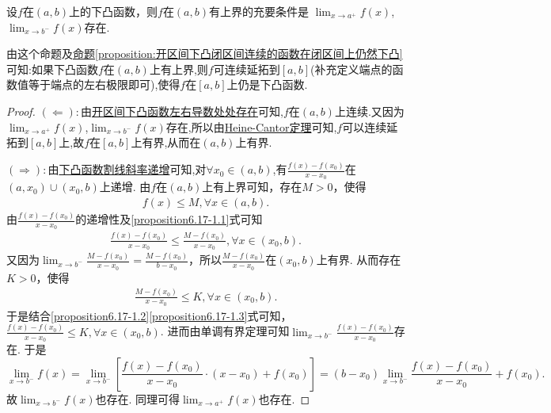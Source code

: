 \documentclass[../../main.tex]{subfiles}%
\begin{document}
\begin{proposition}\label{proposition:开区间的下凸函数有上界的充要条件}
设\(f\)在\((a,b)\)上的下凸函数，则\(f\)在\((a,b)\)有上界的充要条件是
$\lim_{x\rightarrow a^{+}}f(x)$,$\lim_{x\rightarrow b^{-}}f(x)$存在.
\end{proposition}
\begin{note}
由这个命题及\hyperref[proposition:开区间下凸闭区间连续的函数在闭区间上仍然下凸]{命题\ref{proposition:开区间下凸闭区间连续的函数在闭区间上仍然下凸}}可知:如果下凸函数$f$在$(a,b)$上有上界,则$f$可连续延拓到$[a,b]$(补充定义端点的函数值等于端点的左右极限即可),使得$f$在$[a,b]$上仍是下凸函数.
\end{note}
\begin{proof}

$(\Leftarrow):$由\hyperref[theorem:开区间下凸函数左右导数处处存在]{开区间下凸函数左右导数处处存在}可知,$f$在$(a,b)$上连续.又因为$\lim_{x\rightarrow a^{+}}f(x)$,$\lim_{x\rightarrow b^{-}}f(x)$存在,所以由\hyperref[theroem:Heine-Cantor定理]{Heine-Cantor定理}可知,$f$可以连续延拓到$[a,b]$上,故$f$在$[a,b]$上有界,从而在$(a,b)$上有界.

$(\Rightarrow):$由\hyperref[下凸函数割线斜率递增]{下凸函数割线斜率递增}可知,对$\forall x_0\in (a,b)$,有\(\frac{f(x) - f(x_0)}{x - x_0}\)在\((a, x_0)\cup(x_0, b)\)上递增. 由\(f\)在\((a, b)\)上有上界可知，存在\(M > 0\)，使得
\begin{align}
f(x)\leqslant M, \forall x\in(a, b). \label{proposition6.17-1.1}
\end{align}
由\(\frac{f(x) - f(x_0)}{x - x_0}\)的递增性及\eqref{proposition6.17-1.1}式可知
\begin{align}
\frac{f(x) - f(x_0)}{x - x_0}\leqslant\frac{M - f(x_0)}{x - x_0}, \forall x\in(x_0, b). \label{proposition6.17-1.2}
\end{align}
又因为\(\lim_{x\rightarrow b^-}\frac{M - f(x_0)}{x - x_0}=\frac{M - f(x_0)}{b - x_0}\)，所以\(\frac{M - f(x_0)}{x - x_0}\)在\((x_0, b)\)上有界. 从而存在\(K > 0\)，使得
\begin{align}
\frac{M - f(x_0)}{x - x_0}\leqslant K, \forall x\in(x_0, b).
\label{proposition6.17-1.3}  
\end{align}
于是结合\eqref{proposition6.17-1.2}\eqref{proposition6.17-1.3}式可知，\(\frac{f(x) - f(x_0)}{x - x_0}\leqslant K, \forall x\in(x_0, b)\). 进而由单调有界定理可知\(\lim_{x\rightarrow b^-}\frac{f(x) - f(x_0)}{x - x_0}\)存在. 于是
\[
\lim_{x\rightarrow b^-}f(x)=\lim_{x\rightarrow b^-}\left[\frac{f(x) - f(x_0)}{x - x_0}\cdot(x - x_0)+f(x_0)\right]=(b - x_0)\lim_{x\rightarrow b^-}\frac{f(x) - f(x_0)}{x - x_0}+f(x_0).
\]
故\(\lim_{x\rightarrow b^-}f(x)\)也存在. 同理可得\(\lim_{x\rightarrow a^+}f(x)\)也存在.

\end{proof}
\end{document}

